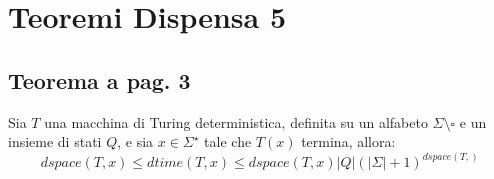 \section{Teoremi Dispensa 5}

\subsection{Teorema a pag. 3}

Sia $T$ una macchina di Turing deterministica, definita su un alfabeto $\Sigma \setminus \square$ e 
un insieme di stati $Q$, e sia $x\in \Sigma^{\star}$ tale che $T(x)$ termina, allora: 
$$dspace(T, x) \leq dtime(T, x) \leq dspace(T, x)|Q|(|\Sigma| + 1)^{dspace(T, )}$$